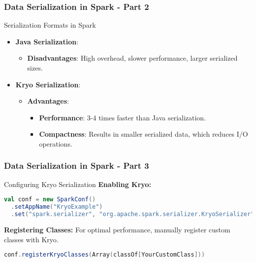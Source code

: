 \documentclass[aspectratio=169]{beamer}
\begin{document}
\begin{frame}[fragile]
    \frametitle{Data Serialization in Spark - Part 2}
    \begin{block}{Serialization Formats in Spark}
        \begin{itemize}
            \item \textbf{Java Serialization}:
                \begin{itemize}
                    \item \textbf{Disadvantages}: High overhead, slower performance, larger serialized sizes.
                \end{itemize}
            \item \textbf{Kryo Serialization}:
                \begin{itemize}
                    \item \textbf{Advantages}:
                        \begin{itemize}
                            \item \textbf{Performance}: 3-4 times faster than Java serialization.
                            \item \textbf{Compactness}: Results in smaller serialized data, which reduces I/O operations.
                        \end{itemize}
                \end{itemize}
        \end{itemize}
    \end{block}
\end{frame}

\begin{frame}[fragile]
    \frametitle{Data Serialization in Spark - Part 3}
    \begin{block}{Configuring Kryo Serialization}
        \textbf{Enabling Kryo:}
        \begin{lstlisting}[language=Scala]
val conf = new SparkConf()
  .setAppName("KryoExample")
  .set("spark.serializer", "org.apache.spark.serializer.KryoSerializer")
        \end{lstlisting}
        
        \textbf{Registering Classes:} For optimal performance, manually register custom classes with Kryo.
        \begin{lstlisting}[language=Scala]
conf.registerKryoClasses(Array(classOf[YourCustomClass]))
        \end{lstlisting}
    \end{block}
\end{frame}
\end{document}
